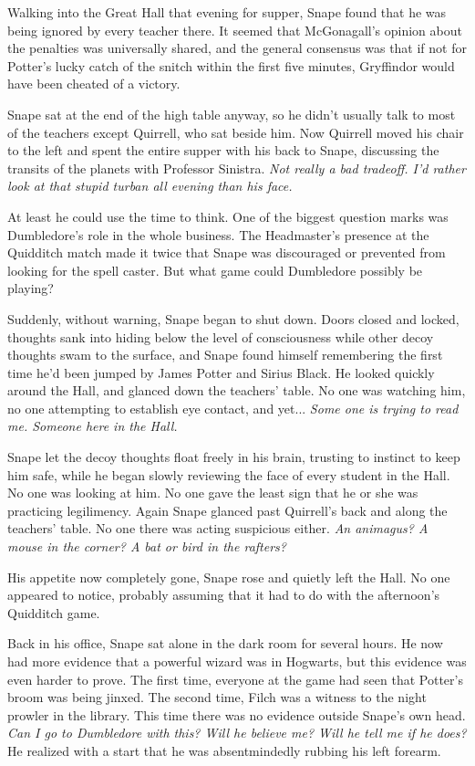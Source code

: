 Walking into the Great Hall that evening for supper, Snape found that he was being ignored by every teacher there. It seemed that McGonagall's opinion about the penalties was universally shared, and the general consensus was that if not for Potter's lucky catch of the snitch within the first five minutes, Gryffindor would have been cheated of a victory.

Snape sat at the end of the high table anyway, so he didn't usually talk to most of the teachers except Quirrell, who sat beside him. Now Quirrell moved his chair to the left and spent the entire supper with his back to Snape, discussing the transits of the planets with Professor Sinistra. \emph{Not really a bad tradeoff. I'd rather look at that stupid turban all evening than his face.}

At least he could use the time to think. One of the biggest question marks was Dumbledore's role in the whole business. The Headmaster's presence at the Quidditch match made it twice that Snape was discouraged or prevented from looking for the spell caster. But what game could Dumbledore possibly be playing?

Suddenly, without warning, Snape began to shut down. Doors closed and locked, thoughts sank into hiding below the level of consciousness while other decoy thoughts swam to the surface, and Snape found himself remembering the first time he'd been jumped by James Potter and Sirius Black. He looked quickly around the Hall, and glanced down the teachers' table. No one was watching him, no one attempting to establish eye contact, and yet... \emph{Some one is trying to read me. Someone here in the Hall.}

Snape let the decoy thoughts float freely in his brain, trusting to instinct to keep him safe, while he began slowly reviewing the face of every student in the Hall. No one was looking at him. No one gave the least sign that he or she was practicing legilimency. Again Snape glanced past Quirrell's back and along the teachers' table. No one there was acting suspicious either. \emph{An animagus? A mouse in the corner? A bat or bird in the rafters?}

His appetite now completely gone, Snape rose and quietly left the Hall. No one appeared to notice, probably assuming that it had to do with the afternoon's Quidditch game.

Back in his office, Snape sat alone in the dark room for several hours. He now had more evidence that a powerful wizard was in Hogwarts, but this evidence was even harder to prove. The first time, everyone at the game had seen that Potter's broom was being jinxed. The second time, Filch was a witness to the night prowler in the library. This time there was no evidence outside Snape's own head. \emph{Can I go to Dumbledore with this? Will he believe me? Will he tell me if he does?} He realized with a start that he was absentmindedly rubbing his left forearm.

